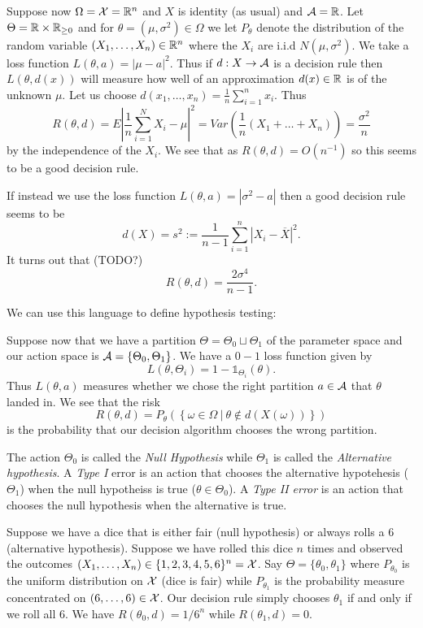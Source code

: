 \documentclass[twoside, a4paper, 10pt]{amsart}
\begin{document}
\begin{eg} Suppose now $\Omega = \mathcal{X} = \mathbb{R}^n$ and $X$ is identity (as usual) and $\mathcal{A} = \mathbb{R}$. Let $\Theta = \mathbb{R} \times \mathbb{R}_{\geq 0}$ and for $\theta = (\mu, \sigma^2) \in \Omega$ we let $P_{\theta}$ denote the distribution of the random variable $(X_1, \ldots, X_n) \in \mathbb{R}^n$ where the $X_i$ are i.i.d $N(\mu, \sigma^2)$. We take a loss function $L(\theta, a) = |\mu - a|^2$. Thus if $d:X \to \mathcal{A}$ is a decision rule then $L(\theta, d(x))$ will measure how well of an approximation $d(x) \in \mathbb{R}$ is of the unknown $\mu$. Let us choose $d(x_1, \ldots, x_n) = \frac{1}{n} \sum_{i=1}^n x_i$. Thus $$R(\theta, d) = E |\frac{1}{n}\sum_{i=1}^N X_i - \mu|^2 = Var(\frac{1}{n}(X_1 + \ldots + X_n)) = \frac{\sigma^2}{n}$$ by the independence of the $X_i$. We see that as $R(\theta, d) = O(n^{-1})$ so this seems to be a good decision rule.

If instead we use the loss function $L(\theta, a) = |\sigma^2 - a|$ then a good decision rule seems to be $$d(X) = s^2 := \frac{1}{n-1} \sum_{i=1}^n |X_i - \overline{X}|^2.$$ It turns out that (TODO?) $$R(\theta, d) = \frac{2\sigma^4}{n-1}.$$

\end{eg} 

We can use this language to define hypothesis testing:

\begin{mydef} Suppose now that we have a partition $\Theta = \Theta_0 \sqcup \Theta_1$ of the parameter space and our action space is $\mathcal{A} = \{ \Theta_0, \Theta_1\}$. We have a $0-1$ loss function given by $$L(\theta, \Theta_i) = 1 - \mathds{1}_{\Theta_i}(\theta).$$ Thus $L(\theta, a)$ measures whether we chose the right partition $a \in \mathcal{A}$ that $\theta$ landed in. We see that the risk $$R(\theta, d) = P_{\theta} (\left\{ \omega \in \Omega ~|~ \theta \notin d(X(\omega)) \right\} )$$ is the probability that our decision algorithm chooses the wrong partition.

The action $\Theta_0$ is called the \textit{Null Hypothesis} while $\Theta_1$ is called the \textit{Alternative hypothesis}. A \textit{Type I} error is an action that chooses the alternative hypotehesis ($\Theta_1$) when the null hypotheiss is true ($\theta \in \Theta_0$). A \textit{Type II error} is an action that chooses the null hypothesis when the alternative is true.

\end{mydef}

\begin{eg} Suppose we have a dice that is either fair (null hypothesis) or always rolls a 6 (alternative hypothesis). Suppose we have rolled this dice $n$ times and observed the outcomes $(X_1, \ldots, X_n) \in \{1,2,3,4,5,6\}^n = \mathcal{X}$. Say $\Theta = \{\theta_0, \theta_1\}$ where $P_{\theta_0}$ is the uniform distribution on $\mathcal{X}$ (dice is fair) while $P_{\theta_1}$ is the probability measure concentrated on $(6, \ldots, 6) \in \mathcal{X}$. Our decision rule simply chooses $\theta_1$ if and only if we roll all $6$. We have $R(\theta_0, d) = 1/6^n$ while $R(\theta_1,d) = 0$.

\end{eg}
\end{document}
